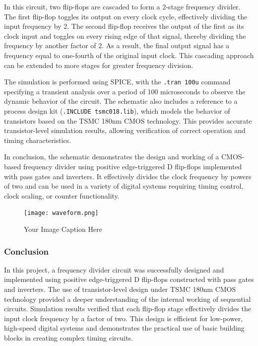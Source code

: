 In this circuit, two flip-flops are cascaded to form a 2-stage frequency divider. The first flip-flop toggles its output on every clock cycle, effectively dividing the input frequency by 2. The second flip-flop receives the output of the first as its clock input and toggles on every rising edge of that signal, thereby dividing the frequency by another factor of 2. As a result, the final output signal has a frequency equal to one-fourth of the original input clock. This cascading approach can be extended to more stages for greater frequency division.

The simulation is performed using SPICE, with the \texttt{.tran 100u} command specifying a transient analysis over a period of 100 microseconds to observe the dynamic behavior of the circuit. The schematic also includes a reference to a process design kit (\texttt{.INCLUDE tsmc018.lib}), which models the behavior of transistors based on the TSMC 180nm CMOS technology. This provides accurate transistor-level simulation results, allowing verification of correct operation and timing characteristics.

In conclusion, the schematic demonstrates the design and working of a CMOS-based frequency divider using positive edge-triggered D flip-flops implemented with pass gates and inverters. It effectively divides the clock frequency by powers of two and can be used in a variety of digital systems requiring timing control, clock scaling, or counter functionality.

\begin{figure}[H] %
    \centering
    \texttt{[image: waveform.png]}
    \caption{Your Image Caption Here}
    \label{fig:Output Waveform}
\end{figure}
\subsubsection*{Conclusion}
In this project, a frequency divider circuit was successfully designed and implemented using positive edge-triggered D flip-flops constructed with pass gates and inverters. The use of transistor-level design under TSMC 180nm CMOS technology provided a deeper understanding of the internal working of sequential circuits. Simulation results verified that each flip-flop stage effectively divides the input clock frequency by a factor of two. This design is efficient for low-power, high-speed digital systems and demonstrates the practical use of basic building blocks in creating complex timing circuits.

